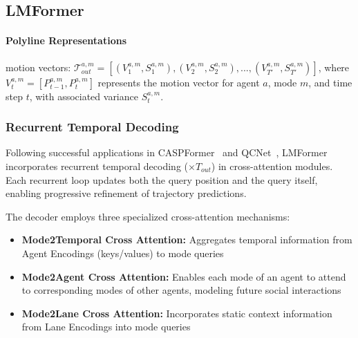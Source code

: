 \subsection{LMFormer}
\label{ssec:lmformer}

\paragraph{Polyline Representations} motion vectors: $\mathcal{T}_{out}^{a,m} = [(V_1^{a,m}, S_1^{a,m}), (V_2^{a,m}, S_2^{a,m}), ..., (V_{T'}^{a,m}, S_{T'}^{a,m})]$, where $V_t^{a,m} = [P_{t-1}^{a,m}, P_t^{a,m}]$ represents the motion vector for agent $a$, mode $m$, and time step $t$, with associated variance $S_t^{a,m}$.


\subsubsection{Recurrent Temporal Decoding}
Following successful applications in CASPFormer~\cite{caspformerYadav2024} and QCNet~\cite{Zhou2023QueryCentric}, LMFormer incorporates recurrent temporal decoding ($\times T_{out}$) in cross-attention modules. Each recurrent loop updates both the query position and the query itself, enabling progressive refinement of trajectory predictions.

The decoder employs three specialized cross-attention mechanisms:
\begin{itemize}
    \item \textbf{Mode2Temporal Cross Attention:} Aggregates temporal information from Agent Encodings (keys/values) to mode queries
    \item \textbf{Mode2Agent Cross Attention:} Enables each mode of an agent to attend to corresponding modes of other agents, modeling future social interactions
    \item \textbf{Mode2Lane Cross Attention:} Incorporates static context information from Lane Encodings into mode queries
\end{itemize}